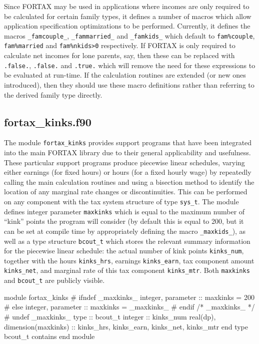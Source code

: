 \documentclass[11pt,thmsa,letter,ukenglish]{article}
\begin{document}
\noindent Since FORTAX may be used in applications where incomes are only required to be calculated for certain family types, it defines a number of macros which allow application specification optimizations to be performed. Currently, it defines the macros \texttt{\_famcouple\_}, \texttt{\_fammarried\_} and \texttt{\_famkids\_} which default to \texttt{fam\%couple}, \texttt{fam\%married} and \texttt{fam\%nkids>0} respectively. If FORTAX is only required to calculate net incomes for lone parents, say, then these can be replaced with \texttt{.false.}, \texttt{.false.} and \texttt{.true.} which will remove the need for these expressions to be evaluated at run-time. If the calculation routines are extended (or new ones introduced), then they should use these macro definitions rather than referring to the derived family type directly.

\subsection{fortax\_kinks.f90}\label{sec:fortaxkinks}

The module \texttt{fortax\_kinks} provides support programs that have been integrated into the main FORTAX library due to their general applicability and usefulness. These particular support programs produce piecewise linear schedules, varying either earnings (for fixed hours) or hours (for a fixed hourly wage) by repeatedly calling the main calculation routines and using a bisection method to identify the location of any marginal rate changes or discontinuities. This can be performed on any component with the tax system structure of type \texttt{sys\_t}. The module defines integer parameter \texttt{maxkinks} which is equal to the maximum number of ``kink'' points the program will consider (by default this is equal to 200, but it can be set at compile time by appropriately defining the macro \texttt{\_maxkids\_}), as well as a type structure \texttt{bcout\_t} which stores the relevant summary information for the piecewise linear schedule: the actual number of kink points \texttt{kinks\_num}, together with the hours \texttt{kinks\_hrs}, earnings \texttt{kinks\_earn}, tax component amount \texttt{kinks\_net}, and marginal rate of this tax component \texttt{kinks\_mtr}. Both \texttt{maxkinks} and \texttt{bcout\_t} are publicly visible.

\begin{fortrancode}
module fortax_kinks
#   ifndef _maxkinks_
    integer, parameter :: maxkinks = 200
#   else
    integer, parameter :: maxkinks = _maxkinks_
#   endif /* _maxkinks_ */
#   undef _maxkinks_
    type :: bcout_t
        integer :: kinks_num
        real(dp), dimension(maxkinks) :: kinks_hrs, kinks_earn, kinks_net, kinks_mtr
    end type bcout_t
contains
end module
\end{fortrancode}
\end{document}
